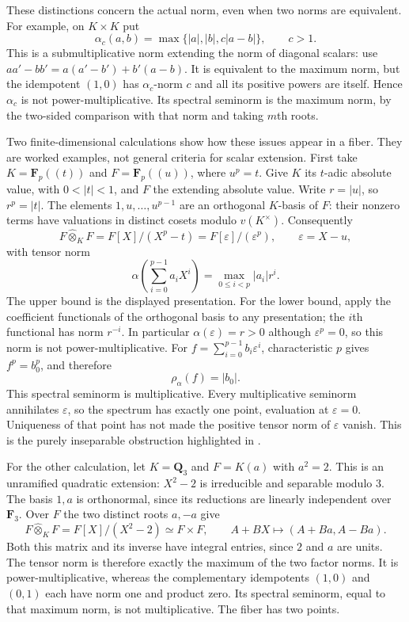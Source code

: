 These distinctions concern the actual norm, even when two norms are
equivalent. For example, on $K\times K$ put
\[
 \alpha_c(a,b)=\max\{|a|,|b|,c|a-b|\},\qquad c>1.
\]
This is a submultiplicative norm extending the norm of diagonal scalars:
use $aa'-bb'=a(a'-b')+b'(a-b)$. It is equivalent to the maximum norm,
but the idempotent $(1,0)$ has $\alpha_c$-norm $c$ and all its positive
powers are itself. Hence $\alpha_c$ is not power-multiplicative. Its
spectral seminorm is the maximum norm, by the two-sided comparison
with that norm and taking $m$th roots.

Two finite-dimensional calculations show how these issues appear in a
fiber. They are worked examples, not general criteria for scalar
extension. First take $K=\mathbf F_p(\!(t)\!)$ and
$F=\mathbf F_p(\!(u)\!)$, where $u^p=t$. Give $K$ its
$t$-adic absolute value, with $0<|t|<1$, and $F$ the extending
absolute value. Write $r=|u|$, so $r^p=|t|$. The elements
$1,u,\ldots,u^{p-1}$ are an orthogonal $K$-basis of $F$: their nonzero
terms have valuations in distinct cosets modulo $v(K^\times)$.
Consequently
\[
 F\widehat\otimes_K F
 =F[X]/(X^p-t)=F[\varepsilon]/(\varepsilon^p),
 \qquad \varepsilon=X-u,
\]
with tensor norm
\[
 \alpha\left(\sum_{i=0}^{p-1}a_iX^i\right)
                  =\max_{0\leq i<p}|a_i|r^i.
\]
The upper bound is the displayed presentation. For the lower bound,
apply the coefficient functionals of the orthogonal basis to any
presentation; the $i$th functional has norm $r^{-i}$.
In particular $\alpha(\varepsilon)=r>0$ although
$\varepsilon^p=0$, so this norm is not power-multiplicative.
For $f=\sum_{i=0}^{p-1}b_i\varepsilon^i$, characteristic $p$ gives
$f^p=b_0^p$, and therefore
\[
                         \rho_\alpha(f)=|b_0|.
\]
This spectral seminorm is multiplicative. Every multiplicative
seminorm annihilates $\varepsilon$, so the spectrum has exactly one
point, evaluation at $\varepsilon=0$. Uniqueness of that point has
not made the positive tensor norm of $\varepsilon$ vanish. This is the
purely inseparable obstruction highlighted in
\cite[Remark~3.8, p.~280]{Poi13Angelic}.

For the other calculation, let $K=\mathbf Q_3$ and
$F=K(a)$ with $a^2=2$. This is an unramified quadratic extension:
$X^2-2$ is irreducible and separable modulo $3$. The basis $1,a$ is
orthonormal, since its reductions are linearly independent over
$\mathbf F_3$. Over $F$ the two distinct roots $a,-a$ give
\[
 F\widehat\otimes_K F=F[X]/(X^2-2)\simeq F\times F,
 \qquad A+BX\longmapsto(A+Ba,A-Ba).
\]
Both this matrix and its inverse have integral entries, since $2$ and
$a$ are units. The tensor norm is therefore exactly the maximum of
the two factor norms. It is power-multiplicative, whereas the
complementary idempotents $(1,0)$ and $(0,1)$ each have norm one and
product zero. Its spectral seminorm, equal to that maximum norm,
is not multiplicative. The fiber has two points.

